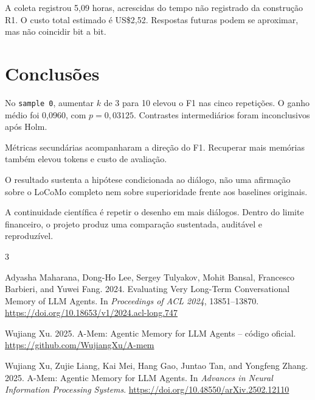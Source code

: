 \documentclass[sigconf]{acmart}
\begin{document}
A coleta registrou 5,09 horas, acrescidas do tempo não registrado da construção R1. O custo total estimado é US\$2,52. Respostas futuras podem se aproximar, mas não coincidir bit a bit.

\section{Conclusões}

No \texttt{sample 0}, aumentar \(k\) de 3 para 10 elevou o F1 nas cinco repetições. O ganho médio foi 0,0960, com \(p=0,03125\). Contrastes intermediários foram inconclusivos após Holm.

Métricas secundárias acompanharam a direção do F1. Recuperar mais memórias também elevou tokens e custo de avaliação.

O resultado sustenta a hipótese condicionada ao diálogo, não uma afirmação sobre o LoCoMo completo nem sobre superioridade frente aos baselines originais.

A continuidade científica é repetir o desenho em mais diálogos. Dentro do limite financeiro, o projeto produz uma comparação sustentada, auditável e reproduzível.


\begin{thebibliography}{3}

Adyasha Maharana, Dong-Ho Lee, Sergey Tulyakov, Mohit Bansal, Francesco Barbieri, and Yuwei Fang. 2024.
Evaluating Very Long-Term Conversational Memory of LLM Agents.
In \textit{Proceedings of ACL 2024}, 13851--13870.
\url{https://doi.org/10.18653/v1/2024.acl-long.747}

Wujiang Xu. 2025.
A-Mem: Agentic Memory for LLM Agents -- código oficial.
\url{https://github.com/WujiangXu/A-mem}

Wujiang Xu, Zujie Liang, Kai Mei, Hang Gao, Juntao Tan, and Yongfeng Zhang. 2025.
A-Mem: Agentic Memory for LLM Agents.
In \textit{Advances in Neural Information Processing Systems}.
\url{https://doi.org/10.48550/arXiv.2502.12110}

\end{thebibliography}
\end{document}
